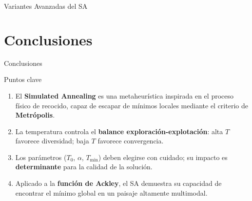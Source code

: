 \documentclass[aspectratio=169,xcolor=dvipsnames]{beamer}
\begin{document}
\begin{frame}{Variantes Avanzadas del SA}
    \begin{table}[h]
        \centering
        \caption{Comparación de variantes del Simulated Annealing}
    \end{table}
\end{frame}

\section{Conclusiones}

\begin{frame}{Conclusiones}
    \begin{block}{Puntos clave}
        \begin{enumerate}
            \item El \textbf{Simulated Annealing} es una metaheurística inspirada en el proceso físico de recocido, capaz de escapar de mínimos locales mediante el criterio de \textbf{Metrópolis}.
            \item La temperatura controla el \textbf{balance exploración-explotación}: alta $T$ favorece diversidad; baja $T$ favorece convergencia.
            \item Los parámetros ($T_0$, $\alpha$, $T_{\min}$) deben elegirse con cuidado; su impacto es \textbf{determinante} para la calidad de la solución.
            \item Aplicado a la \textbf{función de Ackley}, el SA demuestra su capacidad de encontrar el mínimo global en un paisaje altamente multimodal.
        \end{enumerate}
    \end{block}
\end{frame}
\end{document}
